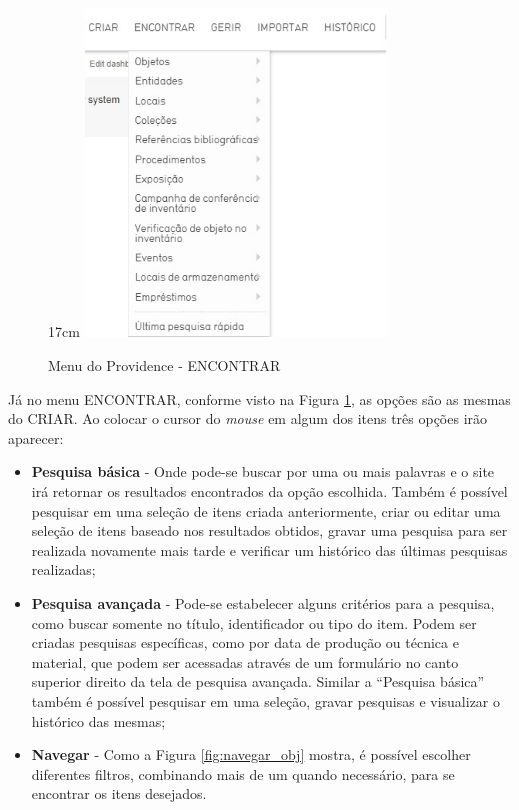 \documentclass[a4paper,12pt,oneside,onecolumn,final,fleqn]{repUERJ}
\begin{document}
\begin{figure}[!ht]{17cm}
	\includegraphics[width=8cm, center]{figuras/menu_encontrar.jpg}
	\caption{Menu do Providence - ENCONTRAR} \label{fig:menu_encontrar}
\end{figure}

Já no menu ENCONTRAR, conforme visto na Figura \ref{fig:menu_encontrar}, as opções são as mesmas do CRIAR. Ao colocar o cursor do \textit{mouse} em algum dos itens três opções irão aparecer: 

\begin{itemize}
	\item \textbf{Pesquisa básica} - Onde pode-se buscar por uma ou mais palavras e o site irá retornar os resultados encontrados da opção escolhida. Também é possível pesquisar em uma seleção de itens criada anteriormente, criar ou editar uma seleção de itens baseado nos resultados obtidos, gravar uma pesquisa para ser realizada novamente mais tarde e verificar um histórico das últimas pesquisas realizadas;
	\item \textbf{Pesquisa avançada} - Pode-se estabelecer alguns critérios para a pesquisa, como buscar somente no título, identificador ou tipo do item. Podem ser criadas pesquisas específicas, como por data de produção ou técnica e material, que podem ser acessadas através de um formulário no canto superior direito da tela de pesquisa avançada. Similar a ``Pesquisa básica'' também é possível pesquisar em uma seleção, gravar pesquisas e visualizar o histórico das mesmas;
	\item \textbf{Navegar} - Como a Figura \ref{fig:navegar_obj} mostra, é possível escolher diferentes filtros, combinando mais de um quando necessário, para se encontrar os itens desejados.
\end{itemize}
\end{document}
